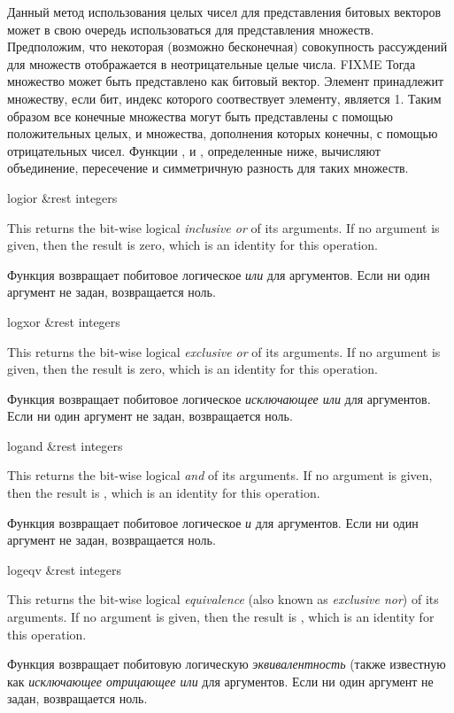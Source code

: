 Данный метод использования целых чисел для представления битовых векторов может
в свою очередь использоваться для представления множеств. Предположим, что
некоторая (возможно бесконечная) совокупность рассуждений для множеств отображается
в неотрицательные целые числа. FIXME
Тогда множество может быть представлено как битовый вектор. Элемент принадлежит
множеству, если бит, индекс которого соотвествует элементу, является 1.
Таким образом все конечные множества могут быть представлены с помощью
положительных целых, и множества, дополнения которых конечны, с помощью
отрицательных чисел. Функции ,  и ,
определенные ниже, вычисляют объединение, пересечение и симметричную разность для
таких множеств.

\begin{defun}[Function]
logior &rest integers

This returns the bit-wise logical \emph{inclusive or} of its arguments.
If no argument is given, then the result is zero,
which is an identity for this operation.

Функция возвращает побитовое логическое \emph{или} для аргументов.
Если ни один аргумент не задан, возвращается ноль.
\end{defun}

\begin{defun}[Function]
logxor &rest integers

This returns the bit-wise logical \emph{exclusive or} of its arguments.
If no argument is given, then the result is zero,
which is an identity for this operation.

Функция возвращает побитовое логическое \emph{исключающее или} для аргументов.
Если ни один аргумент не задан, возвращается ноль.
\end{defun}

\begin{defun}[Function]
logand &rest integers

This returns the bit-wise logical \emph{and} of its arguments.
If no argument is given, then the result is ,
which is an identity for this operation.

Функция возвращает побитовое логическое \emph{и} для аргументов.
Если ни один аргумент не задан, возвращается ноль.
\end{defun}

\begin{defun}[Function]
logeqv &rest integers

This returns the bit-wise logical \emph{equivalence} (also known as \emph{exclusive nor})
of its arguments.
If no argument is given, then the result is ,
which is an identity for this operation.

Функция возвращает побитовую логическую \emph{эквивалентность} (также известную
как \emph{исключающее отрицающее или} для аргументов.
Если ни один аргумент не задан, возвращается ноль.
\end{defun}

